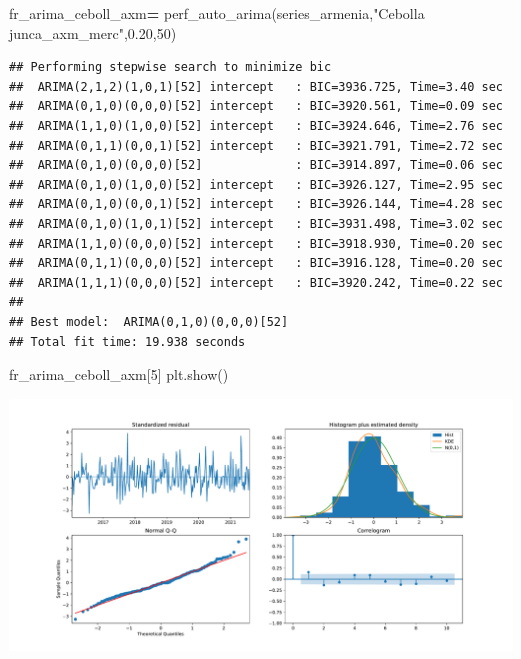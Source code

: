 \documentclass[
]{book}
\newenvironment{Shaded}{\begin{snugshade}}{\end{snugshade}}
\newcommand{\DecValTok}[1]{\textcolor[rgb]{0.00,0.00,0.81}{#1}}
\newcommand{\FloatTok}[1]{\textcolor[rgb]{0.00,0.00,0.81}{#1}}
\newcommand{\NormalTok}[1]{#1}
\newcommand{\OperatorTok}[1]{\textcolor[rgb]{0.81,0.36,0.00}{\textbf{#1}}}
\newcommand{\StringTok}[1]{\textcolor[rgb]{0.31,0.60,0.02}{#1}}
\begin{document}
\begin{Shaded}
\begin{Highlighting}[]

\NormalTok{fr\_arima\_ceboll\_axm}\OperatorTok{=}\NormalTok{ perf\_auto\_arima(series\_armenia,}\StringTok{"Cebolla junca\_axm\_merc"}\NormalTok{,}\FloatTok{0.20}\NormalTok{,}\DecValTok{50}\NormalTok{)}
\end{Highlighting}
\end{Shaded}

\begin{verbatim}
## Performing stepwise search to minimize bic
##  ARIMA(2,1,2)(1,0,1)[52] intercept   : BIC=3936.725, Time=3.40 sec
##  ARIMA(0,1,0)(0,0,0)[52] intercept   : BIC=3920.561, Time=0.09 sec
##  ARIMA(1,1,0)(1,0,0)[52] intercept   : BIC=3924.646, Time=2.76 sec
##  ARIMA(0,1,1)(0,0,1)[52] intercept   : BIC=3921.791, Time=2.72 sec
##  ARIMA(0,1,0)(0,0,0)[52]             : BIC=3914.897, Time=0.06 sec
##  ARIMA(0,1,0)(1,0,0)[52] intercept   : BIC=3926.127, Time=2.95 sec
##  ARIMA(0,1,0)(0,0,1)[52] intercept   : BIC=3926.144, Time=4.28 sec
##  ARIMA(0,1,0)(1,0,1)[52] intercept   : BIC=3931.498, Time=3.02 sec
##  ARIMA(1,1,0)(0,0,0)[52] intercept   : BIC=3918.930, Time=0.20 sec
##  ARIMA(0,1,1)(0,0,0)[52] intercept   : BIC=3916.128, Time=0.20 sec
##  ARIMA(1,1,1)(0,0,0)[52] intercept   : BIC=3920.242, Time=0.22 sec
## 
## Best model:  ARIMA(0,1,0)(0,0,0)[52]          
## Total fit time: 19.938 seconds
\end{verbatim}

\begin{Shaded}
\begin{Highlighting}[]
\NormalTok{fr\_arima\_ceboll\_axm[}\DecValTok{5}\NormalTok{]}
\NormalTok{plt.show()}
\end{Highlighting}
\end{Shaded}

\includegraphics{bookdown-demo_files/figure-latex/unnamed-chunk-151-139.pdf}
\end{document}
